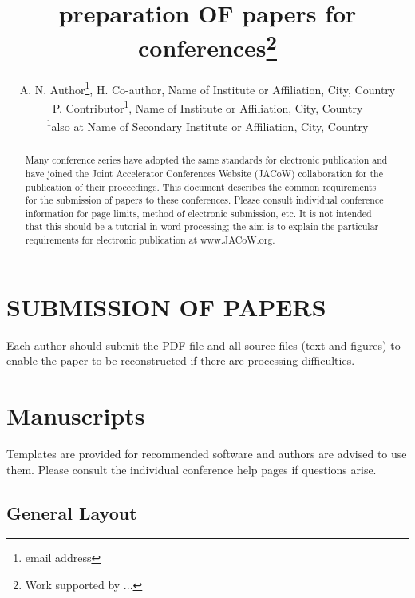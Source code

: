 \documentclass[a4paper,
              ]{jacow}
\begin{document}
\title{preparation OF papers for  conferences\thanks{Work supported by ...}}

\author{A. N. Author\thanks{email address}, H. Co-author, Name of Institute or Affiliation, City, Country \\
		P. Contributor\textsuperscript{1}, Name of Institute or Affiliation, City, Country \\
		\textsuperscript{1}also at Name of Secondary Institute or Affiliation, City, Country}
	
\maketitle

%
\begin{abstract}
   Many conference series have adopted the same standards
   for electronic publication and have joined the Joint
   Accelerator Conferences Website (JACoW) collaboration
   for the publication of their proceedings. This document
   describes the common requirements for the submission of
   papers to these conferences. Please consult individual
   conference information for page limits, method of electronic
   submission, etc. It is not intended that this should
   be a tutorial in word processing; the aim is to explain the
   particular requirements for electronic publication at
   www.JACoW.org.
\end{abstract}


\section{SUBMISSION OF PAPERS}
Each author should submit the PDF file and all source
files (text and figures) to enable the paper to be
reconstructed if there are processing difficulties.

\section{Manuscripts}
Templates are provided for recommended software and
authors are advised to use them. Please consult the
individual conference help pages if questions arise.

\subsection{General Layout}
\end{document}
